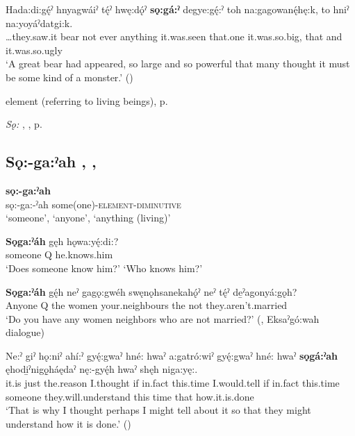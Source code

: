 \ea
\label{ex:spart60}
\gll Hada:di:gę́ˀ hnyagwáiˀ tę́ˀ hwę:dǫ́ˀ \textbf{sǫ:gá:ˀ} degye:gę́:ˀ toh na:gagowanę́hę:k, to hniˀ na:yoyáˀdatgi:k.\\
…they.saw.it bear not ever anything it.was.seen that.one it.was.so.big, that and it.was.so.ugly\\
\glt ‘A great bear had appeared, so large and so powerful that many thought it must be some kind of a monster.’ (\cite{carrier_legends_2013})
\z

\begin{CayugaRelated}
\item {} element (referring to living beings), p. \pageref{p:[-ga:ˀ]}\\
\item \textit{Sǫ:} , , p. \pageref{p:[sǫ:]}
\end{CayugaRelated}


\subsection*{\textbf{Sǫ:-ga:ˀah} , , } \label{p:[sǫ:-ga:ˀah] ‘someone’}

\ea
\label{ex:spart0}
\gll \textbf{sǫ:-ga:ˀah} {}\\
sǫ:-ga:-ˀah some(one)-\textsc{element-diminutive}\\
\glt ‘someone’, ‘anyone’, ‘anything (living)’
\z

\ea
\label{ex:spart61}
\gll \textbf{Sǫga:ˀáh} gęh hǫwa:yę́:di:?\\
someone Q he.knows.him\\
\glt ‘Does someone know him?’ `Who knows him?’
\z

\ea
\label{ex:spart62}
\gll \textbf{Sǫga:ˀáh} gę́h neˀ gagǫ:gwéh swęnǫhsanekahǫ́ˀ neˀ tę́ˀ de̱ˀagonyá:gǫh?\\
Anyone Q the women your.neighbours the not they.aren’t.married\\
\glt ‘Do you have any women neighbors who are not married?’ (\cite[88]{mithun_watewayestanih_1984}, Eksaˀgó:wah dialogue)
\z

\ea
\label{ex:spart65}
\gll Ne:ˀ giˀ hǫ:niˀ ahí:ˀ gyę́:gwaˀ hné: hwaˀ a:gatró:wiˀ gyę́:gwaˀ hné: hwaˀ \textbf{sǫgá:ˀah} ęhodi̱ˀnigǫ̱háędaˀ nę:-gyę́h hwaˀ shęh niga:yę:.\\
it.is just the.reason I.thought if in.fact this.time I.would.tell if in.fact this.time someone they.will.understand this time that how.it.is.done\\
\glt ‘That is why I thought perhaps I might tell about it so that they might understand how it is done.’ (\cite{mithun_how_1980})
\z

